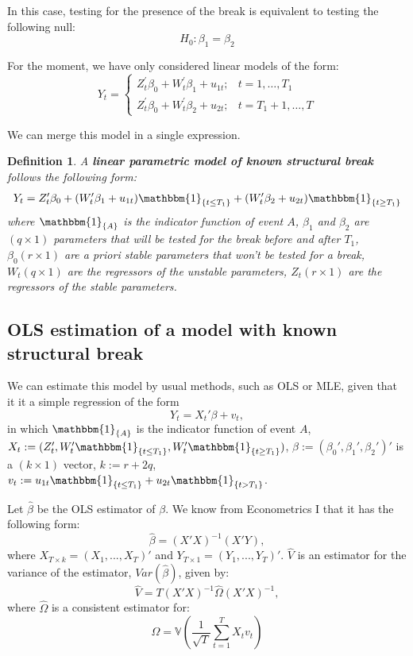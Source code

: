 \documentclass[11pt, a4paper]{report}
\theoremstyle{plain}
\theoremstyle{plain}
\newtheorem{defn}{Definition}[section]
\theoremstyle{remark}
\begin{document}
In this case, testing for the presence of the break is equivalent to testing the following null:
$$ H_0: \beta_1 = \beta_2 $$

For the moment, we have only considered linear models of the form:
$$Y_{t}=\left\{\begin{array}{ll}
{Z}_{t}^{\prime} {\beta}_{0}+{{W}}_{t}^{\prime} {\beta}_{1}+u_{1 t} ; & t=1, \ldots, T_{1} \\
{Z}_{t}^{\prime} {\beta}_{0}+{W}_{t}^{\prime} {\beta}_{2}+u_{2 t} ; & t=T_{1}+1, \ldots, T
\end{array}\right.$$

We can merge this model in a single expression.

\begin{defn}
A \textbf{linear parametric model of known structural break} follows the following form: 
$$
Y_t = Z_t'\beta_0 + (W_t'\beta_1 + u_{1t})\mathbbm{1}_{\{t \leq T_1\}} + (W_t'\beta_2 + u_{2t})\mathbbm{1}_{\{t \geq T_1\}} 
$$
where $\mathbbm{1}_{\{A\}}$ is the indicator function of event $A$, ${\beta}_{1}$ and ${\beta}_{2}$ are $(q \times 1)$ parameters that will be tested for the break before and after $T_1$, $\beta_0 (r \times 1)$ are a priori stable parameters that won't be tested for a break, $W_t (q \times 1)$ are the regressors of the unstable parameters, $Z_t (r \times 1)$ are the regressors of the stable parameters.
\end{defn} 

\subsection{OLS estimation of a model with known structural break}

We can estimate this model by usual methods, such as OLS or MLE, given that it it a simple regression of the form
$$Y_t = X_t'\beta + v_t,$$
in which $\mathbbm{1}_{\{A\}}$ is the indicator function of event $A$, $X_t := (Z_t', W_t'\mathbbm{1}_{\{t \leq T_1\}}, W_t'\mathbbm{1}_{\{t \geq T_1\}})$, $\beta := (\beta_0', \beta_1', \beta_2')'$ is a $(k \times 1)$ vector, $k := r + 2q$, $v_{t}:=u_{1 t} \mathbbm{1}_{\left\{t \leq T_{1}\right\}}+u_{2 t} \mathbbm{1}_{\left\{t>T_{1}\right\}}$.

Let $\hat{\beta}$ be the OLS estimator of $\beta$. We know from Econometrics I that it has the following form:
$$ \hat{\beta} = (X'X)^{-1} (X'Y), $$
where $X_{T \times k} = (X_1, ..., X_T)'$ and $Y_{T \times 1} = (Y_1, ..., Y_T)'$. $\hat{V}$ is an estimator for the variance of the estimator, $Var(\hat{\beta})$, given by:
$$ \hat{V} = T(X'X)^{-1} \hat{\Omega} (X'X)^{-1}, $$
where $\hat{\Omega}$ is a consistent estimator for:
$${\Omega}=\mathbb{V}\left(\frac{1}{\sqrt{T}} \sum_{t=1}^{T} {{X}}_{t} v_{t}\right)$$
\end{document}
